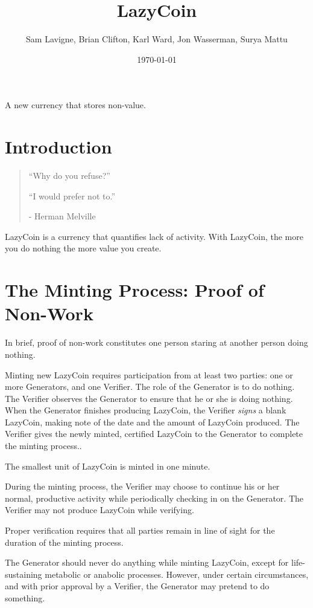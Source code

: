 \documentclass[a4paper]{article}
\title{LazyCoin}
\author{Sam Lavigne, Brian Clifton, Karl Ward, Jon Wasserman, Surya Mattu}
\date{\today}
\begin{document}
\maketitle

\abstract
A new currency that stores non-value.


\section{Introduction}

\begin{quote}
``Why do you refuse?''

``I would prefer not to.''

- Herman Melville
\end{quote}


LazyCoin is a currency that quantifies lack of activity. With LazyCoin, the more you do nothing the more value you create. 


\section{The Minting Process: Proof of Non-Work}

In brief, proof of non-work constitutes one person staring at another person doing nothing.

Minting new LazyCoin requires participation from at least two parties: one or more Generators, and one Verifier. The role of the Generator is to do nothing. The Verifier observes the Generator to ensure that he or she is doing nothing. When the Generator finishes producing LazyCoin, the Verifier \textit{signs} a blank LazyCoin, making note of the date and the amount of LazyCoin produced. The Verifier gives the newly minted, certified LazyCoin to the Generator to complete the minting process.. 

The smallest unit of LazyCoin is minted in one minute.

During the minting process, the Verifier may choose to continue his or her normal, productive activity while periodically checking in on the Generator. The Verifier may not produce LazyCoin while verifying.

Proper verification requires that all parties remain in line of sight for the duration of the minting process.

The Generator should never do anything while minting LazyCoin, except for life-sustaining metabolic or anabolic processes. However, under certain circumstances, and with prior approval by a Verifier, the Generator may pretend to do something.
\end{document}
